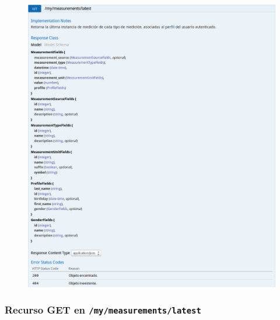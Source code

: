\begin{figure}[h]
  \centering
  \includegraphics[width=\textwidth,height=.75\textheight,keepaspectratio]{img/especificacion_api/myLatestMeasurementList_get}
  \label{myLatestMeasurementList_get}
\end{figure}

\newpage


\subsubsection{Recurso GET en \texttt{/my/measurements/latest}}

